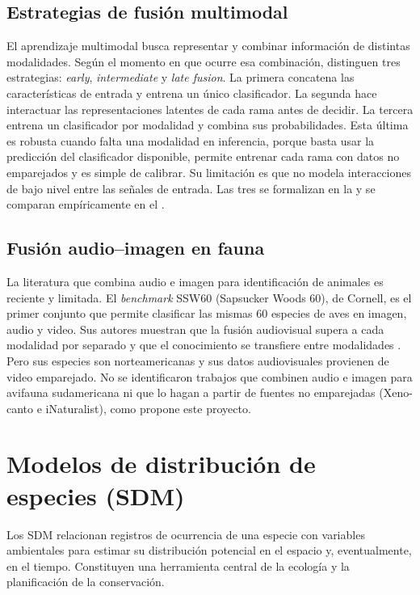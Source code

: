 \subsection*{Estrategias de fusión multimodal}

El aprendizaje multimodal busca representar y combinar información de
distintas modalidades. Según el momento en que ocurre esa combinación,
\citet{baltrusaitis2019multimodal} distinguen tres estrategias:
\textit{early}, \textit{intermediate} y \textit{late fusion}. La primera
concatena las características de entrada y entrena un único clasificador. La
segunda hace interactuar las representaciones latentes de cada rama antes de
decidir. La tercera entrena un clasificador por modalidad y combina sus
probabilidades. Esta última es robusta cuando falta una modalidad en
inferencia, porque basta usar la predicción del clasificador disponible,
permite entrenar cada rama con datos no emparejados y es simple de calibrar.
Su limitación es que no modela interacciones de bajo nivel entre las señales
de entrada. Las tres se formalizan en la  y se
comparan empíricamente en el .

\subsection*{Fusión audio--imagen en fauna}

La literatura que combina audio e imagen para identificación de animales es
reciente y limitada. El \textit{benchmark} SSW60 (Sapsucker Woods 60), de
Cornell, es el primer conjunto que permite clasificar las mismas 60 especies
de aves en imagen, audio y video. Sus autores muestran que la fusión
audiovisual supera a cada modalidad por separado y que el conocimiento
se transfiere entre modalidades \citep{vanhorn2022ssw60}. Pero sus especies son
norteamericanas y sus datos audiovisuales provienen de video emparejado. No se identificaron trabajos que combinen audio e imagen para
avifauna sudamericana ni que lo hagan a partir de fuentes no emparejadas
(Xeno-canto e iNaturalist), como propone este proyecto.

\section{Modelos de distribución de especies (SDM)}\label{sec:rel-sdm}

Los SDM relacionan registros de ocurrencia de una especie con variables
ambientales para estimar su distribución potencial en el espacio y,
eventualmente, en el tiempo. Constituyen una
herramienta central de la ecología y la planificación de la conservación.

